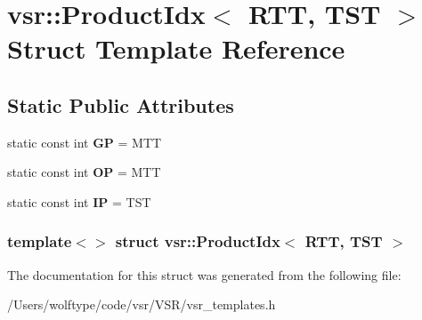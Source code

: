 \hypertarget{structvsr_1_1_product_idx_3_01_r_t_t_00_01_t_s_t_01_4}{\section{vsr\-:\-:Product\-Idx$<$ R\-T\-T, T\-S\-T $>$ Struct Template Reference}
\label{structvsr_1_1_product_idx_3_01_r_t_t_00_01_t_s_t_01_4}
}
\subsection*{Static Public Attributes}
\begin{DoxyCompactItemize}
\item 
\hypertarget{structvsr_1_1_product_idx_3_01_r_t_t_00_01_t_s_t_01_4_a2eb90af2d590823eb27ca178cf1dac9b}{static const int {\bfseries G\-P} = M\-T\-T}\label{structvsr_1_1_product_idx_3_01_r_t_t_00_01_t_s_t_01_4_a2eb90af2d590823eb27ca178cf1dac9b}

\item 
\hypertarget{structvsr_1_1_product_idx_3_01_r_t_t_00_01_t_s_t_01_4_a82b0c1a302ab95c5f771c902cb8f9584}{static const int {\bfseries O\-P} = M\-T\-T}\label{structvsr_1_1_product_idx_3_01_r_t_t_00_01_t_s_t_01_4_a82b0c1a302ab95c5f771c902cb8f9584}

\item 
\hypertarget{structvsr_1_1_product_idx_3_01_r_t_t_00_01_t_s_t_01_4_a1ac7c2640e1e5eedae3318519620cdf8}{static const int {\bfseries I\-P} = T\-S\-T}\label{structvsr_1_1_product_idx_3_01_r_t_t_00_01_t_s_t_01_4_a1ac7c2640e1e5eedae3318519620cdf8}

\end{DoxyCompactItemize}
\subsubsection*{template$<$$>$ struct vsr\-::\-Product\-Idx$<$ R\-T\-T, T\-S\-T $>$}



The documentation for this struct was generated from the following file\-:\begin{DoxyCompactItemize}
\item 
/\-Users/wolftype/code/vsr/\-V\-S\-R/vsr\-\_\-templates.\-h\end{DoxyCompactItemize}
